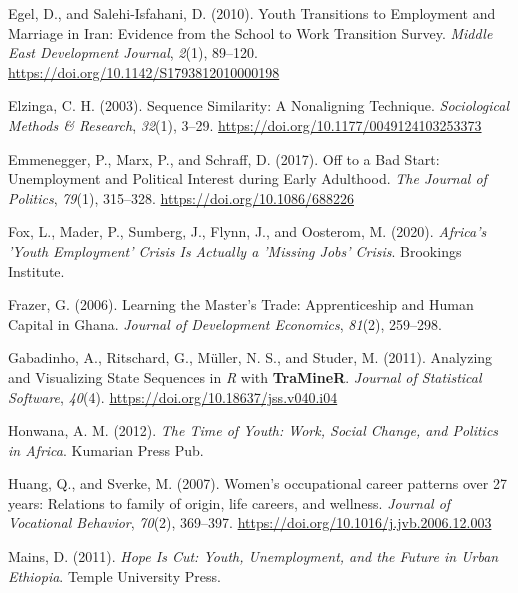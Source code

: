 \documentclass[
  11pt,
a4paper
]{article}
\newlength{\cslhangindent}
\newenvironment{CSLReferences}[2] %
 {%
  \setlength{\parindent}{0pt}
  \ifodd #1 \everypar{\setlength{\hangindent}{\cslhangindent}}\ignorespaces\fi
  \ifnum #2 > 0
  \setlength{\parskip}{#2\baselineskip}
  \fi
 }%
 {}
\begin{document}
\begin{CSLReferences}{1}{0}
\leavevmode{}%
Egel, D., and Salehi-Isfahani, D. (2010). Youth {Transitions} to {Employment} and {Marriage} in {Iran}: {Evidence} from the {School} to {Work Transition Survey}. \emph{Middle East Development Journal}, \emph{2}(1), 89--120. \url{https://doi.org/10.1142/S1793812010000198}

\leavevmode{}%
Elzinga, C. H. (2003). Sequence {Similarity}: {A Nonaligning Technique}. \emph{Sociological Methods \& Research}, \emph{32}(1), 3--29. \url{https://doi.org/10.1177/0049124103253373}

\leavevmode{}%
Emmenegger, P., Marx, P., and Schraff, D. (2017). Off to a {Bad Start}: {Unemployment} and {Political Interest} during {Early Adulthood}. \emph{The Journal of Politics}, \emph{79}(1), 315--328. \url{https://doi.org/10.1086/688226}

\leavevmode{}%
Fox, L., Mader, P., Sumberg, J., Flynn, J., and Oosterom, M. (2020). \emph{Africa's '{Youth Employment}' {Crisis Is Actually} a '{Missing Jobs}' {Crisis}}. {Brookings Institute}.

\leavevmode{}%
Frazer, G. (2006). Learning the {Master}'s {Trade}: {Apprenticeship} and {Human Capital} in {Ghana}. \emph{Journal of Development Economics}, \emph{81}(2), 259--298.

\leavevmode{}%
Gabadinho, A., Ritschard, G., Müller, N. S., and Studer, M. (2011). Analyzing and {Visualizing State Sequences} in {\emph{R}} with {\textbf{TraMineR}}. \emph{Journal of Statistical Software}, \emph{40}(4). \url{https://doi.org/10.18637/jss.v040.i04}

\leavevmode{}%
Honwana, A. M. (2012). \emph{The {Time} of {Youth}: {Work}, {Social Change}, and {Politics} in {Africa}}. {Kumarian Press Pub}.

\leavevmode{}%
Huang, Q., and Sverke, M. (2007). Women's occupational career patterns over 27 years: {Relations} to family of origin, life careers, and wellness. \emph{Journal of Vocational Behavior}, \emph{70}(2), 369--397. \url{https://doi.org/10.1016/j.jvb.2006.12.003}

\leavevmode{}%
Mains, D. (2011). \emph{Hope {Is Cut}: {Youth}, {Unemployment}, and the {Future} in {Urban Ethiopia}}. {Temple University Press}.


\end{CSLReferences}
\end{document}
